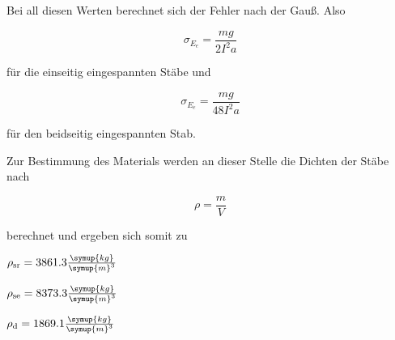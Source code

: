 Bei all diesen Werten berechnet sich der Fehler nach der Gauß. Also

\begin{equation}
  \sigma_\text{$E_e$} = \frac{m g}{2 I^2 a}
\end{equation}

für die einseitig eingespannten Stäbe und

\begin{equation}
  \sigma_\text{$E_e$} = \frac{m g}{48 I^2 a}
\end{equation}

für den beidseitig eingespannten Stab.

Zur Bestimmung des Materials werden an dieser Stelle die Dichten der Stäbe nach

\begin{equation}
  \rho = \frac{m}{V}
\end{equation}

berechnet und ergeben sich somit zu

\vspace{.05em}
\centerline{$\rho_\text{sr} = 3861.3 \frac{\symup{kg}}{\symup{m}^3}$}
\vspace{.05em}

\vspace{.05em}
\centerline{$\rho_\text{se} = 8373.3 \frac{\symup{kg}}{\symup{m}^3}$}
\vspace{.05em}

\vspace{.05em}
\centerline{$\rho_\text{d} = 1869.1 \frac{\symup{kg}}{\symup{m}^3}$}
\vspace{.05em}